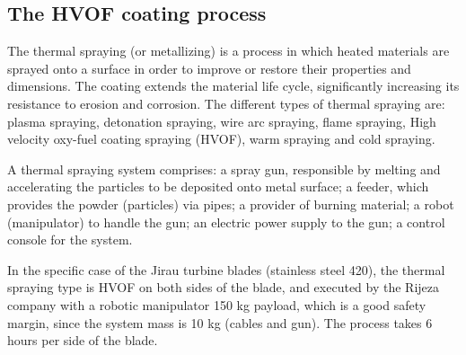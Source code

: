 \subsection{The HVOF coating process}\label{sec::desc_hvof}
The thermal spraying (or metallizing) is a process in which
heated materials are sprayed onto a surface in order to improve or
restore their properties and dimensions. The coating extends the material life
cycle, significantly increasing its resistance to erosion and corrosion.
The different types of thermal spraying are: plasma spraying, detonation
spraying, wire arc spraying, flame spraying, High velocity oxy-fuel coating
spraying (HVOF), warm spraying and cold spraying.


A thermal spraying system comprises: a spray gun, responsible
by melting and accelerating the particles to be deposited onto metal
surface; a feeder, which provides the powder (particles) via pipes;
a provider of burning material; a robot (manipulator) to handle the gun; an
electric power supply to the gun; a control console for the system.

In the specific case of the Jirau turbine blades (stainless steel 420),
the thermal spraying type is HVOF on both sides of the blade, and executed by
the Rijeza company with a robotic manipulator 150 kg payload, which is a good
safety margin, since the system mass is 10 kg (cables and gun). The process takes 6
hours per side of the blade.


